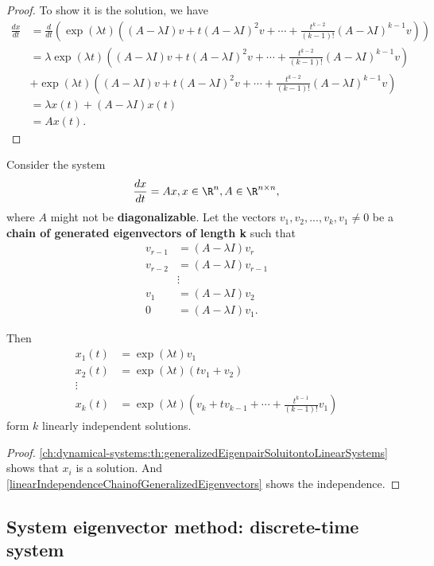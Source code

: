 \begin{refsection}
\begin{proof}
To show it is the solution, we have
\begin{align*}
\frac{dx}{dt} &= \frac{d}{dt}(\exp(\lambda t)((A-\lambda I)v + t(A-\lambda I)^2v + \cdots + \frac{t^{k-2}}{(k-1)!}(A-\lambda I)^{k-1}v)) \\
&=\lambda\exp(\lambda t)((A-\lambda I)v + t(A-\lambda I)^2v + \cdots + \frac{t^{k-2}}{(k-1)!}(A-\lambda I)^{k-1}v) \\
&+ \exp(\lambda t)((A-\lambda I)v + t(A-\lambda I)^2v + \cdots + \frac{t^{k-2}}{(k-1)!}(A-\lambda I)^{k-1}v) \\
&=\lambda x(t) + (A - \lambda I) x(t) \\
&= Ax(t).
\end{align*}
\end{proof}

\begin{theorem}
	Consider the system
	$$\frac{dx}{dt} = Ax, x\in \R^n, A\in \R^{n\times n},$$
	where $A$ might not be \textbf{diagonalizable}. Let the vectors $v_1,v_2,...,v_k,v_1\neq 0$ be a \textbf{chain of generated eigenvectors of length k} such that
	\begin{align*}
	v_{r-1} &= (A - \lambda I)v_r\\
	v_{r-2} &= (A - \lambda I)v_{r-1}\\
	&\vdots\\
	v_{1} &= (A - \lambda I)v_{2}\\
	0 &= (A - \lambda I)v_{1}.
	\end{align*}	
	
	Then 
	\begin{align*}
	x_1(t) &= \exp(\lambda t)v_1 \\
	x_2(t) &= \exp(\lambda t)(tv_1+v_2) \\
	\vdots & \\
	x_k(t) &= \exp(\lambda t)(v_k + tv_{k-1} + \cdots + \frac{t^{k-1}}{(k-1)!}v_1)
	\end{align*}
	form $k$ linearly independent solutions.
\end{theorem}
\begin{proof}
\autoref{ch:dynamical-systems:th:generalizedEigenpairSoluitontoLinearSystems}	shows that $x_i$ is a solution. And \autoref{linearIndependenceChainofGeneralizedEigenvectors} shows the independence.
\end{proof}


\subsection{System eigenvector method: discrete-time system}

\end{refsection}
